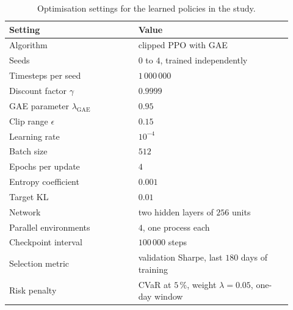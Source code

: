 \begin{table}[tbp]
\caption{Optimisation settings for the learned policies in the study.}
\label{tab:app:training}
\centering
\small
\begin{tabular}{@{}L{0.42\linewidth}L{0.50\linewidth}@{}}
\toprule
\textbf{Setting} & \textbf{Value} \\
\midrule
Algorithm & clipped PPO with GAE \\
Seeds & $0$ to $4$, trained independently \\
Timesteps per seed & $1\,000\,000$ \\
Discount factor $\gamma$ & $0.9999$ \\
GAE parameter $\lambda_{\mathrm{GAE}}$ & $0.95$ \\
Clip range $\epsilon$ & $0.15$ \\
Learning rate & $10^{-4}$ \\
Batch size & $512$ \\
Epochs per update & $4$ \\
Entropy coefficient & $0.001$ \\
Target KL & $0.01$ \\
Network & two hidden layers of $256$ units \\
Parallel environments & $4$, one process each \\
Checkpoint interval & $100\,000$ steps \\
Selection metric & validation Sharpe, last $180$ days of training \\
Risk penalty & CVaR at $5\,\%$, weight $\lambda=0.05$, one-day window \\
\bottomrule
\end{tabular}
\end{table}
